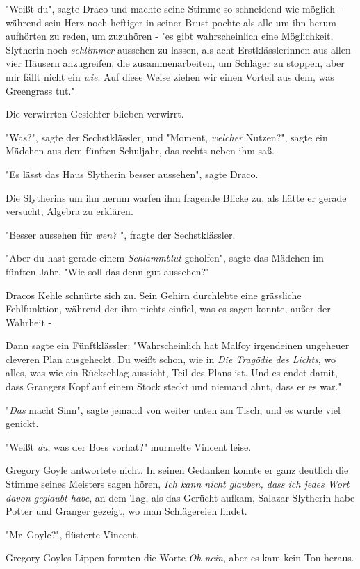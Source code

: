 {"Weißt du", sagte Draco und machte seine Stimme so schneidend wie möglich - während sein Herz noch heftiger in seiner Brust pochte als alle um ihn herum aufhörten zu reden, um zuzuhören - "es gibt wahrscheinlich eine Möglichkeit, Slytherin noch \emph{schlimmer} aussehen zu lassen, als acht Erstklässlerinnen aus allen vier Häusern anzugreifen, die zusammenarbeiten, um Schläger zu stoppen, aber mir fällt nicht ein \emph{wie}. Auf diese Weise ziehen wir einen Vorteil aus dem, was Greengrass tut."

Die verwirrten Gesichter blieben verwirrt.

"Was?", sagte der Sechstklässler, und "Moment, \emph{welcher} Nutzen?", sagte ein Mädchen aus dem fünften Schuljahr, das rechts neben ihm saß.

"Es lässt das Haus Slytherin besser aussehen", sagte Draco.

Die Slytherins um ihn herum warfen ihm fragende Blicke zu, als hätte er gerade versucht, Algebra zu erklären.

"Besser aussehen für \emph{wen?} ", fragte der Sechstklässler.

"Aber du hast gerade einem \emph{Schlammblut} geholfen", sagte das Mädchen im fünften Jahr. "Wie soll das denn gut aussehen?"

Dracos Kehle schnürte sich zu. Sein Gehirn durchlebte eine grässliche Fehlfunktion, während der ihm nichts einfiel, was es sagen konnte, außer der Wahrheit -

Dann sagte ein Fünftklässler: "Wahrscheinlich hat Malfoy irgendeinen ungeheuer cleveren Plan ausgeheckt. Du weißt schon, wie in \emph{Die Tragödie des Lichts}, wo alles, was wie ein Rückschlag aussieht, Teil des Plans ist. Und es endet damit, dass Grangers Kopf auf einem Stock steckt und niemand ahnt, dass er es war."

"\emph{Das} macht Sinn", sagte jemand von weiter unten am Tisch, und es wurde viel genickt.

"Weißt \emph{du}, was der Boss vorhat?" murmelte Vincent leise.

Gregory Goyle antwortete nicht. In seinen Gedanken konnte er ganz deutlich die Stimme seines Meisters sagen hören, \emph{Ich kann nicht glauben, dass ich jedes Wort davon geglaubt habe}, an dem Tag, als das Gerücht aufkam, Salazar Slytherin habe Potter und Granger gezeigt, wo man Schlägereien findet.

"Mr~Goyle?", flüsterte Vincent.

Gregory Goyles Lippen formten die Worte \emph{Oh nein}, aber es kam kein Ton heraus.

}

